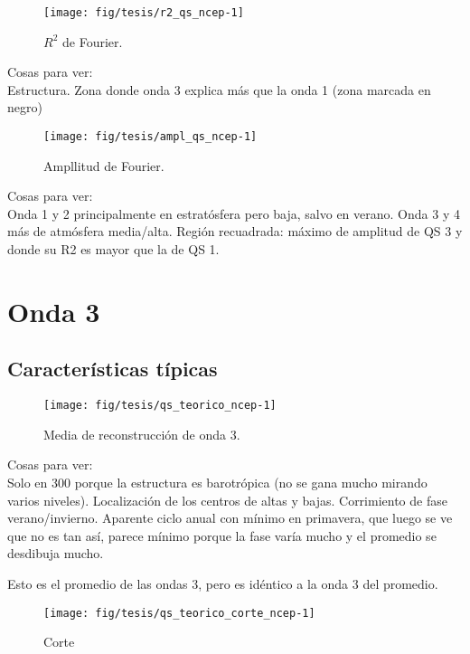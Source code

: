 \documentclass[spanish,a4paper]{book}
\begin{document}
\begin{figure}

{\centering \texttt{[image: fig/tesis/r2\_qs\_ncep-1]} 

}

\caption{$R^2$ de Fourier.}\label{fig:r2_qs_ncep}
\end{figure}

Cosas para ver:\\
Estructura. Zona donde onda 3 explica más que la onda 1 (zona marcada en
negro)

\begin{figure}

{\centering \texttt{[image: fig/tesis/ampl\_qs\_ncep-1]} 

}

\caption{Ampllitud de Fourier.}\label{fig:ampl_qs_ncep}
\end{figure}

Cosas para ver:\\
Onda 1 y 2 principalmente en estratósfera pero baja, salvo en verano.
Onda 3 y 4 más de atmósfera media/alta. Región recuadrada: máximo de
amplitud de QS 3 y donde su R2 es mayor que la de QS 1.

\chapter{Onda 3}\label{onda-3}

\section{Características típicas}\label{caracteristicas-tipicas}

\begin{figure*}
\texttt{[image: fig/tesis/qs\_teorico\_ncep-1]} \caption{Media de reconstrucción de onda 3.}\label{fig:qs_teorico_ncep}
\end{figure*}

Cosas para ver:\\
Solo en 300 porque la estructura es barotrópica (no se gana mucho
mirando varios niveles). Localización de los centros de altas y bajas.
Corrimiento de fase verano/invierno. Aparente ciclo anual con mínimo en
primavera, que luego se ve que no es tan así, parece mínimo porque la
fase varía mucho y el promedio se desdibuja mucho.

Esto es el promedio de las ondas 3, pero es idéntico a la onda 3 del
promedio.

\begin{figure*}
\texttt{[image: fig/tesis/qs\_teorico\_corte\_ncep-1]} \caption{Corte}\label{fig:qs_teorico_corte_ncep}
\end{figure*}
\end{document}
